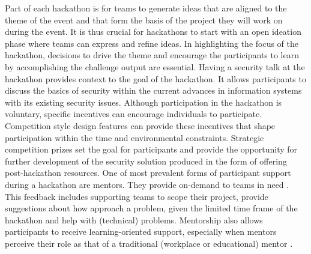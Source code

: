 \documentclass[runningheads]{llncs}
\begin{document}
Part of each hackathon is for teams to generate ideas that are aligned to the theme of the event and that form the basis of the project they will work on during the event. It is thus crucial for hackathons to start with an open ideation phase \cite{bohmer2015open} where teams can express and refine ideas. %
In highlighting the focus of the hackathon, decisions to drive the theme and encourage the participants to learn by accomplishing the challenge output are essential. Having a security talk at the hackathon provides context to the goal of the hackathon. It allows participants to discuss the basics of security within the current advances in information systems with its existing security issues. 
Although participation in the hackathon is voluntary, specific incentives can encourage %
individuals to participate. Competition style design features can provide these incentives that shape participation \cite{grimes2008robotics} within the time and environmental constraints. Strategic competition prizes set the goal for participants and provide the opportunity for further development of the security solution produced in the form of offering post-hackathon resources.
One of most prevalent forms of participant support during a hackathon are mentors. They provide on-demand to teams in need \cite{soltani2014hackathon,byrne2017iot}. This feedback includes supporting teams to scope their project, provide suggestions about how approach a problem, given the limited time frame of the hackathon \cite{lara2016hackathons} and help with (technical) problems. Mentorship also allows participants to receive learning-oriented support, especially when mentors perceive their role as that of a traditional (workplace or educational) mentor \cite{nolte2020support}.

\end{document}
